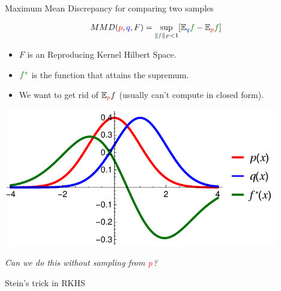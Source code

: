 \begin{frame}
\begin{columns}
\begin{column}{.33\linewidth}
\begin{block}{Maximum Mean Discrepancy for comparing two samples}
\begin{minipage}{.60\linewidth}

\vspace{1cm}
\large
\begin{align*}
MMD({\color{red} p},{ \color{blue} q},F) = \sup_{   \| {\color{mg}f} \|_F<1} [\ev_{{ \color{blue} q}}{\color{mg}f}- \ev_{{\color{red} p}}{\color{mg} f}]   
\end{align*}
\normalsize
\vspace{1cm}
 \begin{itemize}
  \item $F$ is an Reproducing Kernel Hilbert Space.
  \item ${\color{mg} f^*}$ is the function that attains the supremum.
  \item We want to get rid of  $\mathbb{E}_{ {\color{red} p} }f$  (usually can't compute in closed form).
 \end{itemize}

\end{minipage}
\begin{minipage}{.35\linewidth}

\begin{center}
\vspace{-1cm}
\hspace{-2.5cm}
\includegraphics[width=12cm,height=6cm]{../../presentation/img/mmd.pdf}
\end{center}
\end{minipage}
\vspace{1cm}
\begin{center}
\emph{Can we do this without sampling from ${\color{red} p}$?}
\end{center}
\end{block}
\vspace{-0.75cm}
\begin{block}{Stein's trick in RKHS}



\end{block}
\end{column}
\end{columns}
\end{frame}
